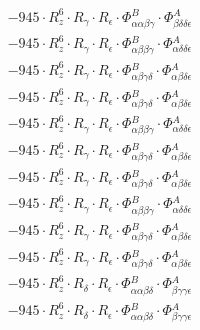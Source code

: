 \documentclass{article}
\begin{document}
\begin{subequations}
\begin{gather}
\begin{array}{c}
 \\[0.2em] 		 - 945 \cdot R_{z}^{6} \cdot R_{\gamma{}} \cdot R_{\epsilon{}} \cdot \Phi{}^{B}_{\alpha{}\alpha{}\beta{}\gamma{}} \cdot \Phi{}^{A}_{\beta{}\delta{}\delta{}\epsilon{}} 
 \\[0.2em] 		 - 945 \cdot R_{z}^{6} \cdot R_{\gamma{}} \cdot R_{\epsilon{}} \cdot \Phi{}^{B}_{\alpha{}\beta{}\beta{}\gamma{}} \cdot \Phi{}^{A}_{\alpha{}\delta{}\delta{}\epsilon{}} 
 \\[0.2em] 		 - 945 \cdot R_{z}^{6} \cdot R_{\gamma{}} \cdot R_{\epsilon{}} \cdot \Phi{}^{B}_{\alpha{}\beta{}\gamma{}\delta{}} \cdot \Phi{}^{A}_{\alpha{}\beta{}\delta{}\epsilon{}} 
 \\[0.2em] 		 - 945 \cdot R_{z}^{6} \cdot R_{\gamma{}} \cdot R_{\epsilon{}} \cdot \Phi{}^{B}_{\alpha{}\beta{}\gamma{}\delta{}} \cdot \Phi{}^{A}_{\alpha{}\beta{}\delta{}\epsilon{}} 
 \\[0.2em] 		 - 945 \cdot R_{z}^{6} \cdot R_{\gamma{}} \cdot R_{\epsilon{}} \cdot \Phi{}^{B}_{\alpha{}\beta{}\beta{}\gamma{}} \cdot \Phi{}^{A}_{\alpha{}\delta{}\delta{}\epsilon{}} 
 \\[0.2em] 		 - 945 \cdot R_{z}^{6} \cdot R_{\gamma{}} \cdot R_{\epsilon{}} \cdot \Phi{}^{B}_{\alpha{}\beta{}\gamma{}\delta{}} \cdot \Phi{}^{A}_{\alpha{}\beta{}\delta{}\epsilon{}} 
 \\[0.2em] 		 - 945 \cdot R_{z}^{6} \cdot R_{\gamma{}} \cdot R_{\epsilon{}} \cdot \Phi{}^{B}_{\alpha{}\beta{}\gamma{}\delta{}} \cdot \Phi{}^{A}_{\alpha{}\beta{}\delta{}\epsilon{}} 
 \\[0.2em] 		 - 945 \cdot R_{z}^{6} \cdot R_{\gamma{}} \cdot R_{\epsilon{}} \cdot \Phi{}^{B}_{\alpha{}\beta{}\beta{}\gamma{}} \cdot \Phi{}^{A}_{\alpha{}\delta{}\delta{}\epsilon{}} 
 \\[0.2em] 		 - 945 \cdot R_{z}^{6} \cdot R_{\gamma{}} \cdot R_{\epsilon{}} \cdot \Phi{}^{B}_{\alpha{}\beta{}\gamma{}\delta{}} \cdot \Phi{}^{A}_{\alpha{}\beta{}\delta{}\epsilon{}} 
 \\[0.2em] 		 - 945 \cdot R_{z}^{6} \cdot R_{\gamma{}} \cdot R_{\epsilon{}} \cdot \Phi{}^{B}_{\alpha{}\beta{}\gamma{}\delta{}} \cdot \Phi{}^{A}_{\alpha{}\beta{}\delta{}\epsilon{}} 
 \\[0.2em] 		 - 945 \cdot R_{z}^{6} \cdot R_{\delta{}} \cdot R_{\epsilon{}} \cdot \Phi{}^{B}_{\alpha{}\alpha{}\beta{}\delta{}} \cdot \Phi{}^{A}_{\beta{}\gamma{}\gamma{}\epsilon{}} 
 \\[0.2em] 		 - 945 \cdot R_{z}^{6} \cdot R_{\delta{}} \cdot R_{\epsilon{}} \cdot \Phi{}^{B}_{\alpha{}\alpha{}\beta{}\delta{}} \cdot \Phi{}^{A}_{\beta{}\gamma{}\gamma{}\epsilon{}} 

\end{array}
\end{gather}
\end{subequations}
\end{document}
